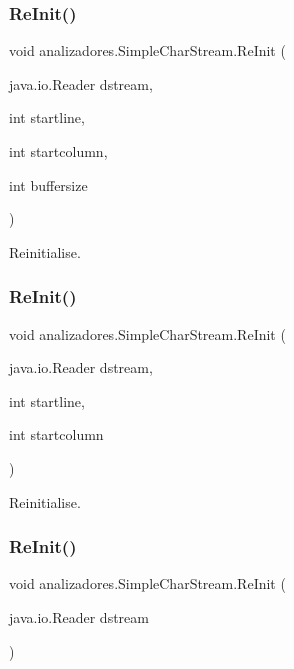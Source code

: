 \subsubsection{\texorpdfstring{Re\+Init()}{ReInit()}\hspace{0.1cm}{\footnotesize\ttfamily [1/9]}}
{\footnotesize\ttfamily void analizadores.\+Simple\+Char\+Stream.\+Re\+Init (\begin{DoxyParamCaption}\item[{java.\+io.\+Reader}]{dstream,  }\item[{int}]{startline,  }\item[{int}]{startcolumn,  }\item[{int}]{buffersize }\end{DoxyParamCaption})}

Reinitialise. \mbox{\label{classanalizadores_1_1_simple_char_stream_ad88c7f702fffeae097e1bbae81601894}} 
\subsubsection{\texorpdfstring{Re\+Init()}{ReInit()}\hspace{0.1cm}{\footnotesize\ttfamily [2/9]}}
{\footnotesize\ttfamily void analizadores.\+Simple\+Char\+Stream.\+Re\+Init (\begin{DoxyParamCaption}\item[{java.\+io.\+Reader}]{dstream,  }\item[{int}]{startline,  }\item[{int}]{startcolumn }\end{DoxyParamCaption})}

Reinitialise. \mbox{\label{classanalizadores_1_1_simple_char_stream_a1c531cf74a9047ec165d25e6b2b6a428}} 
\subsubsection{\texorpdfstring{Re\+Init()}{ReInit()}\hspace{0.1cm}{\footnotesize\ttfamily [3/9]}}
{\footnotesize\ttfamily void analizadores.\+Simple\+Char\+Stream.\+Re\+Init (\begin{DoxyParamCaption}\item[{java.\+io.\+Reader}]{dstream }\end{DoxyParamCaption})}

